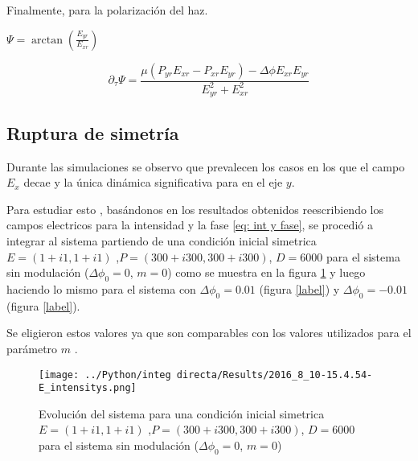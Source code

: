 	
	Finalmente, para la polarización del haz.
	
	$\Psi=\arctan(\frac{E_{yr} }{E_{xr} })$
	
	\begin{equation}
	\partial_{\tau}\Psi  = \frac{\mu(P_{yr}E_{xr}-P_{xr}E_{yr})-\Delta \phi E_{xr}E_{yr}}{E^2_{yr}+E^2_{xr}}
	\end{equation}
	
	
	
	
	\subsection{Ruptura de simetría}
	
	Durante las simulaciones se observo que prevalecen los casos en los que el campo $E_x$ decae y la única dinámica significativa para en el eje $y$.
	
	Para estudiar esto , basándonos en los resultados obtenidos reescribiendo los campos electricos para la intensidad y la fase \ref{eq: int y fase}, se procedió a integrar al sistema partiendo de una condición inicial simetrica $E=(1+i1,1+i1)$ ,$ P=(300+i300,300+i300)$, $D=6000$ para el sistema sin modulación ($\Delta \phi_0=0$, $m=0$) como se muestra en la figura \ref{fig: ci simetrica2} y luego haciendo lo mismo para el sistema con $\Delta \phi_0=0.01$ (figura \ref{label}) y $\Delta \phi_0=-0.01$ (figura \ref{label}).
	
	Se eligieron estos valores ya que son comparables con los valores utilizados para el parámetro $m$ .
	
		\begin{figure}[htc]
			
			\texttt{[image: ../Python/integ directa/Results/2016\_8\_10-15.4.54-E\_intensitys.png]}
			\caption{Evolución del sistema para una condición inicial simetrica $E=(1+i1,1+i1)$ ,$ P=(300+i300,300+i300)$, $D=6000$ para el sistema sin modulación ($\Delta \phi_0=0$, $m=0$)}
			\label{fig: ci simetrica2}
		\end{figure}
		
